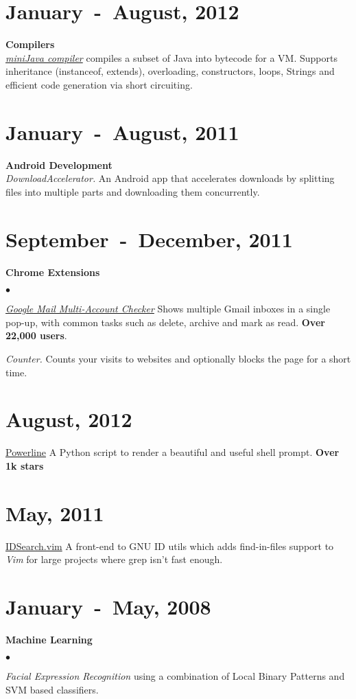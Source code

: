 \documentclass[margin,line]{res}
\newcommand{\datesection}[1]{\section{\textnormal{\scriptsize \textcolor{subtle}{#1}}}}
\newenvironment{list2}{
  \begin{list}{$\bullet$}{%
      \setlength{\itemsep}{0in}
      \setlength{\parsep}{0in} \setlength{\parskip}{0in}
      \setlength{\topsep}{0in} \setlength{\partopsep}{0in} 
      \setlength{\leftmargin}{0.2in}}}{\end{list}}
\begin{document}
\begin{resume}
\datesection{January~-~August, 2012}
{\bf Compilers}\\
{\em \href{https://github.com/milkbikis/miniJava-compiler}{miniJava compiler}} compiles a subset of Java into bytecode for a VM. Supports inheritance (instanceof, extends), overloading, constructors, loops, Strings and efficient code generation via short circuiting.

\datesection{January~-~August, 2011}
{\bf Android Development} \\
{\em DownloadAccelerator.} An Android app that accelerates downloads by splitting files into multiple parts and downloading them concurrently.

\datesection{September~-~December, 2011}
{\bf Chrome Extensions}
\begin{list2}
\item {\href{https://chrome.google.com/webstore/detail/mcpnehokodklgijkcakcfmccgpanipfp}{\em Google Mail Multi-Account Checker}} Shows multiple Gmail inboxes in a single pop-up, with common tasks such as delete, archive and mark as read. \textbf{Over 22,000 users}.
\item {\em Counter.} Counts your visits to websites and optionally blocks the page for a short time.
\end{list2}

\datesection{August, 2012}
{\href{https://github.com/milkbikis/powerline-shell}{Powerline}} A Python script to render a beautiful and useful shell prompt. \textbf{Over 1k stars}
\datesection{May, 2011}
{\href{http://www.vim.org/scripts/script.php?script_id=3630}{IDSearch.vim}} A front-end to GNU ID utils which adds find-in-files support to {\em Vim} for large projects where grep isn't fast enough.

\datesection{January~-~May, 2008}
{\bf Machine Learning}
\begin{list2}
\item {\em Facial Expression Recognition} using a combination of Local Binary Patterns and SVM based classifiers.
\end{list2}


\end{resume}
\end{document}
